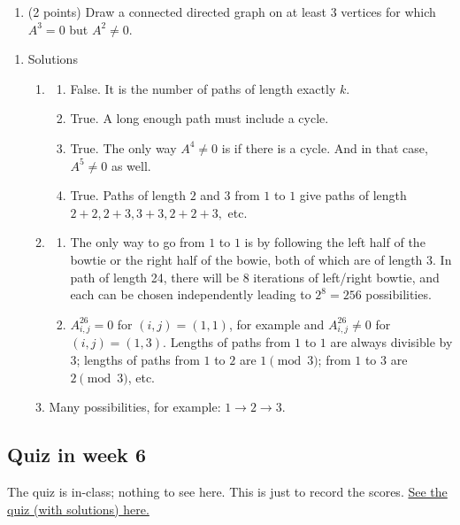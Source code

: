 \documentclass{amsart}
\begin{document}
\begin{enumerate}
\item (2 points) Draw a connected directed graph on at least 3 vertices for which \(A^3 = 0\) but \(A^2 \neq 0\).

\begin{workbox}
\vspace{3cm}
\end{workbox}
\end{enumerate}

\newpage
\begin{enumerate}
\item Solutions
\label{sec:org3dc2888}
\begin{enumerate}
\item \begin{enumerate}
\item False.  It is the number of paths of length exactly \(k\).
\item True.  A long enough path must include a cycle.
\item True.  The only way \(A^4 \neq 0\) is if there is a cycle.  And in that case, \(A^5 \neq 0\) as well.
\item True.  Paths of length \(2\) and \(3\) from \(1\) to \(1\) give paths of length \(2+2, 2+3, 3+3, 2+2+3,\) etc.
\end{enumerate}
\item \begin{enumerate}
\item The only way to go from \(1\) to \(1\) is by following the left half of the bowtie or the right half of the bowie, both of which are of length 3.  In path of length 24, there will be 8 iterations of left/right bowtie, and each can be chosen independently leading to \(2^8 = 256\) possibilities.

\item \(A^{26}_{i,j} = 0\) for \((i,j) = (1,1)\), for example and \(A^{26}_{i,j} \neq 0\) for \((i,j) = (1,3)\). Lengths of paths from \(1\) to \(1\) are always divisible by 3; lengths of paths from \(1\) to \(2\) are \(1 \pmod 3\); from \(1\) to \(3\) are \(2 \pmod 3\), etc.
\end{enumerate}

\item Many possibilities, for example: \(1 \to 2 \to 3\).
\end{enumerate}
\end{enumerate}
\subsection{Quiz in week 6}
\label{sec:org6d477bb}
The quiz is in-class; nothing to see here.  This is just to record the scores.
\href{https://canvas.anu.edu.au/files/847946/download?download\_frd=1\&verifier=wfv6aQrbvmhQAz4zlucmJqQqWL3xN7YycBYkmxVv}{See the quiz (with solutions) here.}
\end{document}
